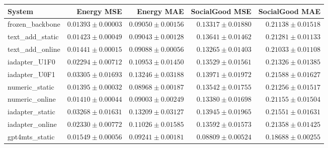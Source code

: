 \begin{tabular}{lrrrr}
\toprule
System & Energy MSE & Energy MAE & SocialGood MSE & SocialGood MAE \\
\midrule
frozen\_backbone & $0.01393 \pm 0.00003$ & $0.09050 \pm 0.00156$ & $0.13317 \pm 0.01880$ & $0.21138 \pm 0.01518$ \\
text\_add\_static & $0.01423 \pm 0.00049$ & $0.09043 \pm 0.00128$ & $0.13641 \pm 0.01462$ & $0.21281 \pm 0.01133$ \\
text\_add\_online & $0.01441 \pm 0.00015$ & $0.09088 \pm 0.00056$ & $0.13265 \pm 0.01403$ & $0.21033 \pm 0.01108$ \\
iadapter\_U1F0 & $0.02294 \pm 0.00712$ & $0.10953 \pm 0.01450$ & $0.13529 \pm 0.01561$ & $0.21326 \pm 0.01385$ \\
iadapter\_U0F1 & $0.03305 \pm 0.01693$ & $0.13246 \pm 0.03188$ & $0.13971 \pm 0.01972$ & $0.21588 \pm 0.01627$ \\
numeric\_static & $0.01395 \pm 0.00032$ & $0.08968 \pm 0.00187$ & $0.13542 \pm 0.01755$ & $0.21256 \pm 0.01517$ \\
numeric\_online & $0.01410 \pm 0.00044$ & $0.09003 \pm 0.00249$ & $0.13380 \pm 0.01698$ & $0.21155 \pm 0.01504$ \\
iadapter\_static & $0.03268 \pm 0.01631$ & $0.13209 \pm 0.03127$ & $0.13945 \pm 0.01965$ & $0.21551 \pm 0.01631$ \\
iadapter\_online & $0.02330 \pm 0.00772$ & $0.11026 \pm 0.01585$ & $0.13592 \pm 0.01573$ & $0.21358 \pm 0.01425$ \\
gpt4mts\_static & $0.01549 \pm 0.00056$ & $0.09241 \pm 0.00181$ & $0.08809 \pm 0.00524$ & $0.18688 \pm 0.00255$ \\
\bottomrule
\end{tabular}
